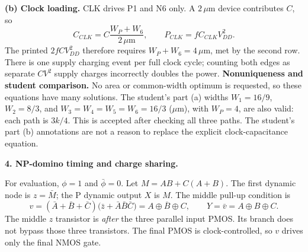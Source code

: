 \documentclass[10pt]{article}
\newcommand{\mos}[4]{\begin{scope}[shift={(#1,#2)}]
\draw (0,.24)--(0,-.24);\draw (0,.20)--(.25,.20)--(.25,.5);
\draw (0,-.20)--(.25,-.20)--(.25,-.5);\draw (-.16,.23)--(-.16,-.23);
\ifnum#4=1\draw (-.26,0) circle (.06);\draw (-.75,0)--(-.32,0);\else\draw (-.75,0)--(-.16,0);\fi
\node[anchor=east,font=\scriptsize] at (-.76,0) {$#3$};\end{scope}}
\newcommand{\ground}[2]{\draw (#1,#2)--(#1,{#2-.12});\draw ({#1-.17},{#2-.12})--({#1+.17},{#2-.12});\draw ({#1-.11},{#2-.20})--({#1+.11},{#2-.20});}
\newcommand{\rail}[3]{\draw (#1,#2)--(#1,{#2+.14});\node[above,font=\scriptsize] at (#1,{#2+.14}) {$#3$};}
\begin{document}
\textbf{(b) Clock loading.} CLK drives P1 and N6 only. A $2\,\mu$m device contributes $C$, so
\[
C_{CLK}=C\frac{W_P+W_6}{2\,\mu\mathrm m},\qquad P_{CLK}=fC_{CLK}V_{DD}^{2}.
\]
The printed $2fCV_{DD}^{2}$ therefore requires $W_P+W_6=4\,\mu$m, met by the second row. There is one supply charging event per full clock cycle; counting both edges as separate $CV^2$ supply charges incorrectly doubles the power.
\textbf{Nonuniqueness and student comparison.} No area or common-width optimum is requested, so these equations have many solutions. The student's part (a) widths $W_1=16/9$, $W_2=8/3$, and $W_3=W_4=W_5=W_6=16/3$ ($\mu$m), with $W_P=4$, are also valid: each path is $3k/4$. This is accepted after checking all three paths. The student's part (b) annotations are not a reason to replace the explicit clock-capacitance equation.

\newpage\textbf{4. NP-domino timing and charge sharing.}
\begin{center}\end{center}
For evaluation, $\phi=1$ and $\bar\phi=0$. Let $M=AB+C(A+B)$. The first dynamic node is $z=\bar M$; the P dynamic output $X$ is $M$. The middle pull-up condition is
\[
v=(\bar A+\bar B+\bar C)\bigl(\bar z+\bar A\bar B\bar C\bigr)
=\overline{A\oplus B\oplus C},\qquad Y=\bar v=A\oplus B\oplus C.
\]
The middle $z$ transistor is \emph{after} the three parallel input PMOS. Its branch does not bypass those three transistors. The final PMOS is clock-controlled, so $v$ drives only the final NMOS gate.
\end{document}
